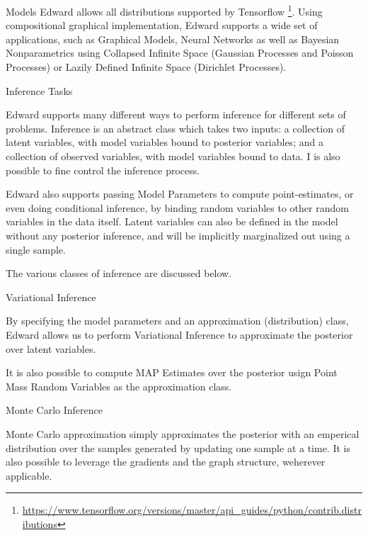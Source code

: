 \documentclass{article}
\begin{document}
\begin{question}
\begin{qsection}{Models}
		Edward allows all distributions supported by Tensorflow \footnote{\url{https://www.tensorflow.org/versions/master/api_guides/python/contrib.distributions}}.
		Using compositional graphical implementation, Edward supports a wide set of applications, such as Graphical Models, Neural Networks as well as Bayesian Nonparametrics using Collapsed Infinite Space (Gaussian Processes and Poisson Processes) or Lazily Defined Infinite Space (Dirichlet Processes).

	\end{qsection}

	\begin{qsection}{Inference Tasks}

		Edward supports many different ways to perform inference for different sets of problems.
		Inference is an abstract class which takes two inputs: a collection of latent variables, with model variables bound to posterior variables; and a collection of observed variables, with model variables bound to data.
		I is also possible to fine control the inference process.

		Edward also supports passing Model Parameters to compute point-estimates, or even doing conditional inference, by binding random variables to other random variables in the data itself.
		Latent variables can also be defined in the model without any posterior inference, and will be implicitly marginalized out using a single sample.

		The various classes of inference are discussed below.
		\clearpage

		\begin{qsubsection}{Variational Inference}

			By specifying the model parameters and an approximation (distribution) class, Edward allows us to perform Variational Inference to approximate the posterior over latent variables.

			It is also possible to compute MAP Estimates over the posterior usign Point Mass Random Variables as the approximation class.

		\end{qsubsection}

		\begin{qsubsection}{Monte Carlo Inference}

			Monte Carlo approximation simply approximates the posterior with an emperical distribution over the samples generated by updating one sample at a time.
			It is also possible to leverage the gradients and the graph structure, weherever applicable.


\end{qsubsection}
\end{qsection}
\end{question}
\end{document}
